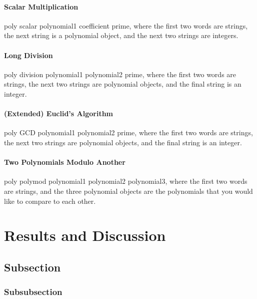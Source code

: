 \documentclass[
10pt, %
a4paper, %
oneside, %
headinclude,footinclude, %
BCOR5mm, %
]{scrartcl}
\begin{document}
\paragraph{Scalar Multiplication}
poly scalar polynomial1 coefficient prime, where the first two words are strings, the next string is a polynomial object, and the next two strings are integers.

\paragraph{Long Division}
poly division polynomial1 polynomial2 prime, where the first two words are strings, the next two strings are polynomial objects, and the final string is an integer.

\paragraph{(Extended) Euclid's Algorithm}
poly GCD polynomial1 polynomial2 prime, where the first two words are strings, the next two strings are polynomial objects, and the final string is an integer.

\paragraph{Two Polynomials Modulo Another}
poly polymod polynomial1 polynomial2 polynomial3, where the first two words are strings, and the three polynomial objects are the polynomials that you would like to compare to each other.


\iffalse

\section{Results and Discussion}

\lipsum[10] %


\subsection{Subsection}

\lipsum[11] %

\subsubsection{Subsubsection}
\end{document}
